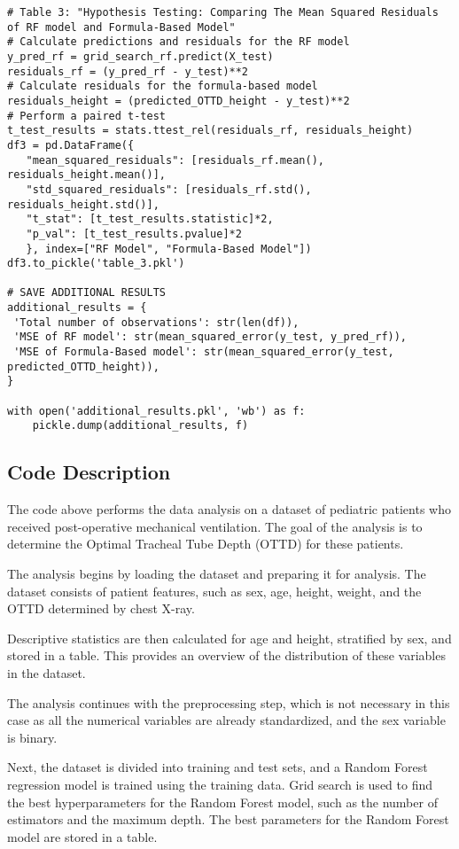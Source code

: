 \documentclass[11pt]{article}
\begin{document}
\begin{verbatim}
# Table 3: "Hypothesis Testing: Comparing The Mean Squared Residuals of RF model and Formula-Based Model"
# Calculate predictions and residuals for the RF model
y_pred_rf = grid_search_rf.predict(X_test)
residuals_rf = (y_pred_rf - y_test)**2
# Calculate residuals for the formula-based model
residuals_height = (predicted_OTTD_height - y_test)**2
# Perform a paired t-test 
t_test_results = stats.ttest_rel(residuals_rf, residuals_height)
df3 = pd.DataFrame({
   "mean_squared_residuals": [residuals_rf.mean(), residuals_height.mean()],
   "std_squared_residuals": [residuals_rf.std(), residuals_height.std()],
   "t_stat": [t_test_results.statistic]*2,
   "p_val": [t_test_results.pvalue]*2
   }, index=["RF Model", "Formula-Based Model"])
df3.to_pickle('table_3.pkl')

# SAVE ADDITIONAL RESULTS
additional_results = {
 'Total number of observations': str(len(df)),
 'MSE of RF model': str(mean_squared_error(y_test, y_pred_rf)),
 'MSE of Formula-Based model': str(mean_squared_error(y_test, predicted_OTTD_height)),
}

with open('additional_results.pkl', 'wb') as f:
    pickle.dump(additional_results, f)

\end{verbatim}

\subsection{Code Description}

The code above performs the data analysis on a dataset of pediatric patients who received post-operative mechanical ventilation. The goal of the analysis is to determine the Optimal Tracheal Tube Depth (OTTD) for these patients. 

The analysis begins by loading the dataset and preparing it for analysis. The dataset consists of patient features, such as sex, age, height, weight, and the OTTD determined by chest X-ray. 

Descriptive statistics are then calculated for age and height, stratified by sex, and stored in a table. This provides an overview of the distribution of these variables in the dataset.

The analysis continues with the preprocessing step, which is not necessary in this case as all the numerical variables are already standardized, and the sex variable is binary.

Next, the dataset is divided into training and test sets, and a Random Forest regression model is trained using the training data. Grid search is used to find the best hyperparameters for the Random Forest model, such as the number of estimators and the maximum depth. The best parameters for the Random Forest model are stored in a table.
\end{document}
